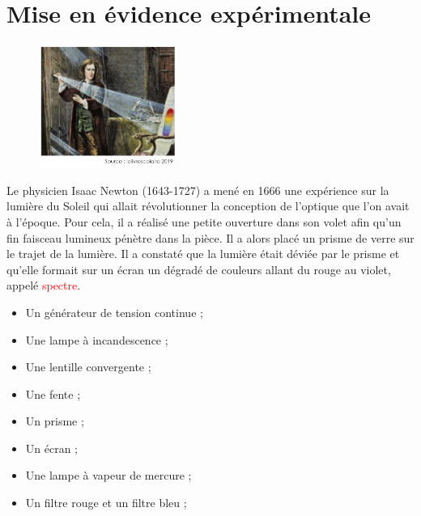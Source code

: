 \section{Mise en évidence expérimentale}
\begin{tcolorbox}[colback=orange!5!white,colframe=orange!75!black,title= Expérience d'Isaac Newton :]
\begin{figure}
\vspace{-0.6cm}
    \centering
     \includegraphics[width=0.4\textwidth]{Images/TP/TP10/Isaac_Newton.PNG}
   \end{figure}
Le physicien Isaac Newton (1643-1727) a mené en 1666 une expérience sur la lumière du Soleil qui allait révolutionner la conception de l'optique que l'on avait à l'époque. Pour cela, il a réalisé une petite ouverture dans son volet afin qu'un fin faisceau lumineux pénètre dans la pièce. Il a alors placé un prisme de verre sur le trajet de la lumière. Il a constaté que la lumière était déviée par le prisme et qu'elle formait sur un écran un dégradé de couleurs allant du rouge au violet, appelé \textcolor{red}{spectre}.\\

\end{tcolorbox}

\begin{mdframed}[style=autreexo]
\textbf{}
\begin{multicols}{2}
    \begin{itemize}
    \item Un générateur de tension continue ;
    \item Une lampe à incandescence ;
    \item Une lentille convergente ;
    \item Une fente ;
    \item Un prisme ;
    \item Un écran ;
    \item Une lampe à vapeur de mercure ;
    \item Un filtre rouge et un filtre bleu ;
\end{itemize}
\end{multicols}
\end{mdframed}

